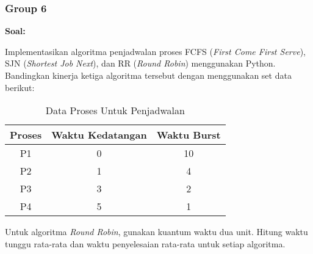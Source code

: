 \documentclass[12pt]{article}
\begin{document}
\subsubsection{Group 6}
\textbf{Soal:}

Implementasikan algoritma penjadwalan proses FCFS (\textit{First Come First Serve}), SJN (\textit{Shortest Job Next}), dan RR (\textit{Round Robin}) menggunakan Python. Bandingkan kinerja ketiga algoritma tersebut dengan menggunakan set data berikut:
    \begin{table}[h] %
        \centering
        \begin{tabular}{|c|c|c|} %
        \hline
        Proses & Waktu Kedatangan & Waktu Burst \\ %
        \hline
        P1 & 0 & 10 \\ %
        \hline
        P2 & 1 & 4 \\ %
        \hline
        P3 & 3 & 2 \\
        \hline
        P4 & 5 & 1 \\
        \hline
        \end{tabular}
        \caption{Data Proses Untuk Penjadwalan} %
        \label{tab:Data Proses Untuk Penjadwalan} %
    \end{table}

Untuk algoritma \textit{Round Robin}, gunakan kuantum waktu dua unit. Hitung waktu tunggu rata-rata dan waktu penyelesaian rata-rata untuk setiap algoritma.
\end{document}
